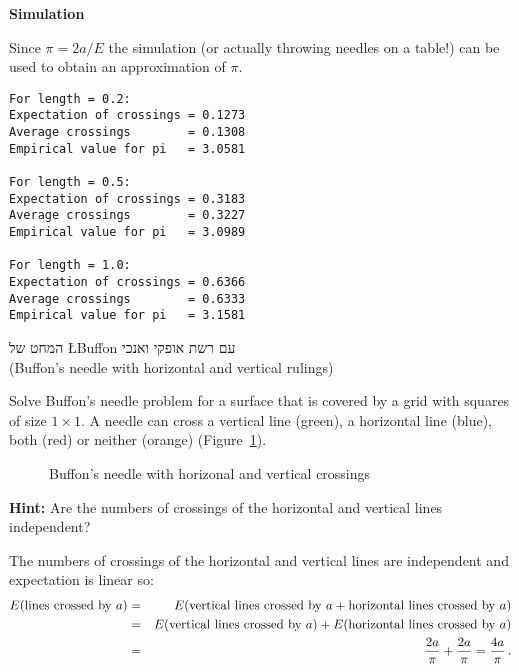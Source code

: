 \textbf{Simulation}

Since $\pi=2a/E$ the simulation (or actually throwing needles on a table!) can be used to obtain an approximation of $\pi$.

\begin{verbatim}
For length = 0.2:
Expectation of crossings = 0.1273
Average crossings        = 0.1308
Empirical value for pi   = 3.0581

For length = 0.5:
Expectation of crossings = 0.3183
Average crossings        = 0.3227
Empirical value for pi   = 3.0989

For length = 1.0:
Expectation of crossings = 0.6366
Average crossings        = 0.6333
Empirical value for pi   = 3.1581
\end{verbatim}


\begin{prob}{המחט של \L{Buffon} עם רשת אופקי ואנכי}{}{\\(Buffon's needle with horizontal and vertical rulings)}

Solve Buffon's needle problem for a surface that is covered by a grid with squares of size $1\times 1$. A needle can cross a vertical line (green), a horizontal line (blue), both (red) or neither (orange) (Figure~\ref{f.buffon5}).

\begin{figure}[b]
\begin{center}
\end{center}
\caption{Buffon's needle with horizonal and vertical crossings}\label{f.buffon5}
\end{figure}
\end{prob}

\textbf{Hint:} Are the numbers of crossings of the horizontal and vertical lines independent?

\solution{}

The numbers of crossings of the horizontal and vertical lines are independent and expectation is linear so:
\begin{eqnarray*}
E(\textrm{lines crossed by\ } a)&=&E(\textrm{vertical lines crossed by\ } a +
     \textrm{horizontal lines crossed by\ } a)\\
&=&E(\textrm{vertical lines crossed by\ } a) +
   E(\textrm{horizontal lines crossed by\ } a)\\
&=&\displaystyle\frac{2a}{\pi}+\displaystyle\frac{2a}{\pi}=\displaystyle\frac{4a}{\pi}\,.
\end{eqnarray*}


